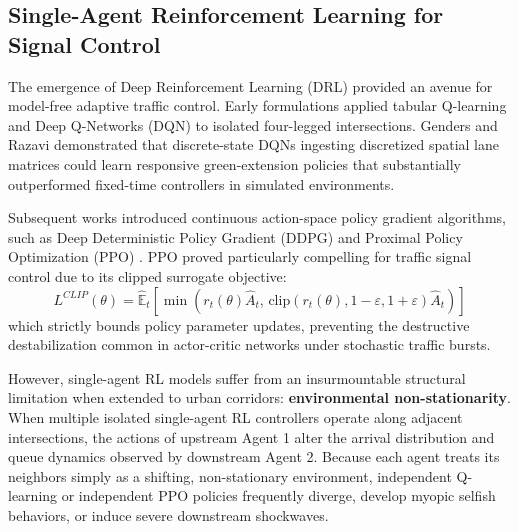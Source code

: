 \documentclass[12pt,a4paper,oneside]{report}
\begin{document}
\subsection{Single-Agent Reinforcement Learning for Signal Control}
The emergence of Deep Reinforcement Learning (DRL) provided an avenue for model-free adaptive traffic control. Early formulations applied tabular Q-learning \cite{ref_abdulhai2003} and Deep Q-Networks (DQN) \cite{ref_oroojlooy2020} to isolated four-legged intersections. Genders and Razavi \cite{ref_genders2016} demonstrated that discrete-state DQNs ingesting discretized spatial lane matrices could learn responsive green-extension policies that substantially outperformed fixed-time controllers in simulated environments.

Subsequent works introduced continuous action-space policy gradient algorithms, such as Deep Deterministic Policy Gradient (DDPG) and Proximal Policy Optimization (PPO) \cite{ref_schulman2017}. PPO proved particularly compelling for traffic signal control due to its clipped surrogate objective:
\begin{equation}
L^{CLIP}(\theta) = \hat{\mathbb{E}}_t \left[ \min\left(r_t(\theta)\hat{A}_t, \, \text{clip}(r_t(\theta), 1-\varepsilon, 1+\varepsilon)\hat{A}_t\right) \right]
\end{equation}
which strictly bounds policy parameter updates, preventing the destructive destabilization common in actor-critic networks under stochastic traffic bursts.

However, single-agent RL models suffer from an insurmountable structural limitation when extended to urban corridors: \textbf{environmental non-stationarity}. When multiple isolated single-agent RL controllers operate along adjacent intersections, the actions of upstream Agent 1 alter the arrival distribution and queue dynamics observed by downstream Agent 2. Because each agent treats its neighbors simply as a shifting, non-stationary environment, independent Q-learning or independent PPO policies frequently diverge, develop myopic selfish behaviors, or induce severe downstream shockwaves.
\end{document}
